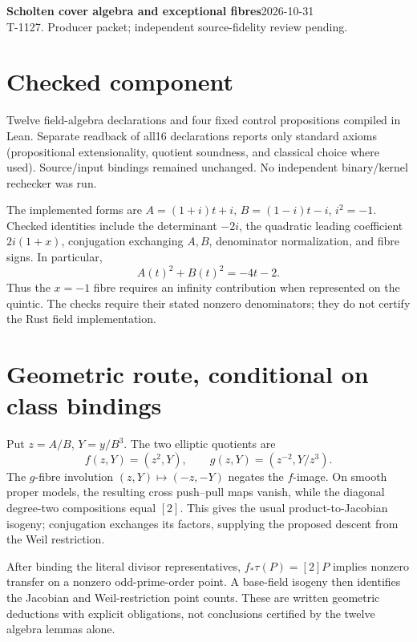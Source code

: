 \documentclass[10pt]{article}
\begin{document}
\textbf{Scholten cover algebra and exceptional fibres}\hfill2026-10-31\\T-1127. Producer packet; independent source-fidelity review pending.
\section*{Checked component}
Twelve field-algebra declarations and four fixed control propositions compiled in Lean. Separate readback of all16 declarations reports only standard axioms (propositional extensionality, quotient soundness, and classical choice where used). Source/input bindings remained unchanged. No independent binary/kernel rechecker was run.

The implemented forms are $A=(1+i)t+i$, $B=(1-i)t-i$, $i^2=-1$. Checked identities include the determinant $-2i$, the quadratic leading coefficient $2i(1+x)$, conjugation exchanging $A,B$, denominator normalization, and fibre signs. In particular,
\[ A(t)^2+B(t)^2=-4t-2. \]
Thus the $x=-1$ fibre requires an infinity contribution when represented on the quintic. The checks require their stated nonzero denominators; they do not certify the Rust field implementation.
\begin{center}\end{center}
\section*{Geometric route, conditional on class bindings}
Put $z=A/B$, $Y=y/B^3$. The two elliptic quotients are
\[f(z,Y)=(z^2,Y),\qquad g(z,Y)=(z^{-2},Y/z^3).\]
The $g$-fibre involution $(z,Y)\mapsto(-z,-Y)$ negates the $f$-image. On smooth proper models, the resulting cross push--pull maps vanish, while the diagonal degree-two compositions equal $[2]$. This gives the usual product-to-Jacobian isogeny; conjugation exchanges its factors, supplying the proposed descent from the Weil restriction.

After binding the literal divisor representatives, $f_*\tau(P)=[2]P$ implies nonzero transfer on a nonzero odd-prime-order point. A base-field isogeny then identifies the Jacobian and Weil-restriction point counts. These are written geometric deductions with explicit obligations, not conclusions certified by the twelve algebra lemmas alone.
\end{document}
